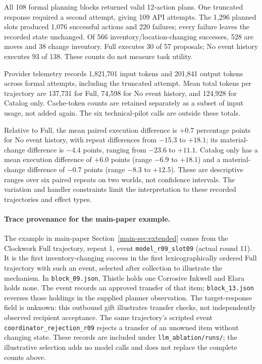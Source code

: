 All 108 formal planning blocks returned valid 12-action plans. One truncated
response required a second attempt, giving 109 API attempts. The 1,296 planned
slots produced 1,076 successful actions and 220 failures; every failure leaves
the recorded state unchanged. Of 566 inventory/location-changing successes,
528 are moves and 38 change inventory. Full executes 30 of 57 proposals;
No event history executes 93 of 138. These counts do not measure task utility.

Provider telemetry records 1,821,701 input tokens and 201,841 output tokens
across formal attempts, including the truncated attempt. Mean total tokens per
trajectory are 137,731 for Full, 74,598 for No event history, and 124,928 for
Catalog only. Cache-token counts are retained separately as a subset of input
usage, not added again. The six technical-pilot calls are outside these totals.

Relative to Full, the mean paired execution difference is $+0.7$ percentage
points for No event history, with repeat differences from $-15.3$ to $+18.1$;
its material-change difference is $-4.4$ points, ranging from $-23.6$ to $+11.1$.
Catalog only has a mean execution difference of $+6.0$ points (range $-6.9$ to
$+18.1$) and a material-change difference of $-0.7$ points (range $-8.3$ to
$+12.5$). These are descriptive ranges over six paired repeats on two worlds,
not confidence intervals. The variation and handler constraints limit the interpretation to these
recorded trajectories and effect types.

\paragraph{Trace provenance for the main-paper example.}
The example in main-paper Section~\ref{main-sec:extended} comes from the
Clockwork Full trajectory, repeat 1, event \texttt{model\_r09\_slot09}
(actual round 11). It is the first inventory-changing success in the first
lexicographically ordered Full trajectory with such an event, selected after
collection to illustrate the mechanism. In \texttt{block\_09.json}, Thistle
holds one Corrosive Inkwell and Elara holds none. The event records an approved
transfer of that item; \texttt{block\_13.json} reverses those holdings in the
supplied planner observation. The target-response field is unknown: this
outbound gift illustrates transfer checks, not independently observed
recipient acceptance. The same trajectory's scripted event
\texttt{coordinator\_rejection\_r09} rejects a transfer of an unowned item
without changing state. These records are included under
\texttt{llm\_ablation/runs/}; the illustrative selection adds no model calls
and does not replace the complete counts above.
